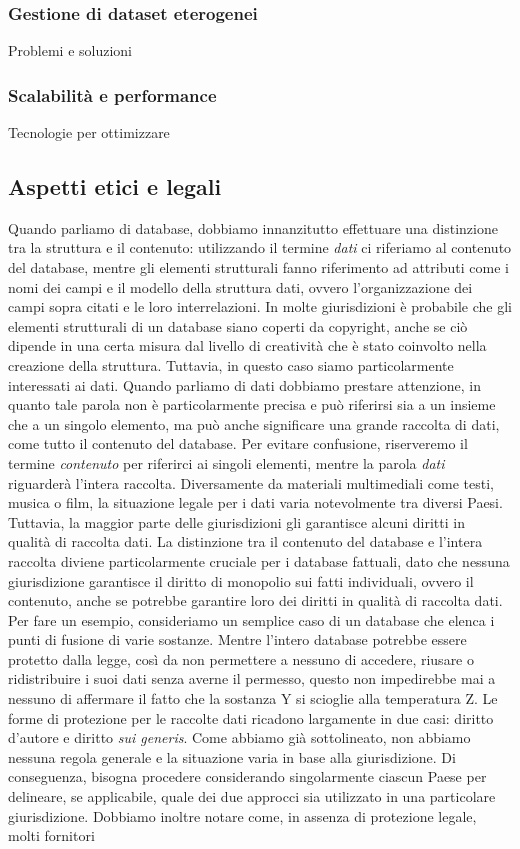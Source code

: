 \subsubsection{Gestione di dataset eterogenei}
Problemi e soluzioni

\subsubsection{Scalabilità e performance}
Tecnologie per ottimizzare

\subsection{Aspetti etici e legali}
Quando parliamo di database, dobbiamo innanzitutto effettuare una distinzione tra la struttura e il contenuto: utilizzando il termine \textit{dati} ci riferiamo al contenuto del database, mentre gli elementi strutturali fanno riferimento ad attributi come i nomi dei campi e il modello della struttura dati, ovvero l'organizzazione dei campi sopra citati e le loro interrelazioni. In molte giurisdizioni è probabile che gli elementi strutturali di un database siano coperti da copyright, anche se ciò dipende in una certa misura dal livello di creatività che è stato coinvolto nella creazione della struttura. Tuttavia, in questo caso siamo particolarmente interessati ai dati. Quando parliamo di dati dobbiamo prestare attenzione, in quanto tale parola non è particolarmente precisa e può riferirsi sia a un insieme che a un singolo elemento, ma può anche significare una grande raccolta di dati, come tutto il contenuto del database. Per evitare confusione, riserveremo il termine \textit{contenuto} per riferirci ai singoli elementi, mentre la parola \textit{dati} riguarderà l'intera raccolta. Diversamente da materiali multimediali come testi, musica o film, la situazione legale per i dati varia notevolmente tra diversi Paesi. Tuttavia, la maggior parte delle giurisdizioni gli garantisce alcuni diritti in qualità di raccolta dati. La distinzione tra il contenuto del database e l'intera raccolta diviene particolarmente cruciale per i database fattuali, dato che nessuna giurisdizione garantisce il diritto di monopolio sui fatti individuali, ovvero il contenuto, anche se potrebbe garantire loro dei diritti in qualità di raccolta dati. Per fare un esempio, consideriamo un semplice caso di un database che elenca i punti di fusione di varie sostanze. Mentre l'intero database potrebbe essere protetto dalla legge, così da non permettere a nessuno di accedere, riusare o ridistribuire i suoi dati senza averne il permesso, questo non impedirebbe mai a nessuno di affermare il fatto che la sostanza Y si scioglie alla temperatura Z. Le forme di protezione per le raccolte dati ricadono largamente in due casi: diritto d'autore e diritto \textit{sui generis}. Come abbiamo già sottolineato, non abbiamo nessuna regola generale e la situazione varia in base alla giurisdizione. Di conseguenza, bisogna procedere considerando singolarmente ciascun Paese per delineare, se applicabile, quale dei due approcci sia utilizzato in una particolare giurisdizione. Dobbiamo inoltre notare come, in assenza di protezione legale, molti fornitori 